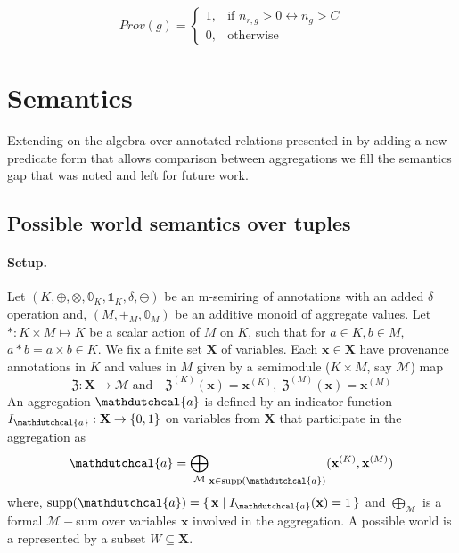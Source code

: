\documentclass[10pt,a4paper]{scrartcl}
\theoremstyle{definition}
\theoremstyle{remark}
\begin{document}
$$Prov(g) = \begin{cases}
   1, & \text{if } n_{r, g} > 0 \leftrightarrow n_g > C \\
   0, & \text{otherwise}
   \end{cases}$$

\section{Semantics}
Extending on the algebra over annotated 
relations presented in \cite{sen2025provsqlgeneralkeepingtrack} by 
adding a new predicate form that allows 
comparison between aggregations we fill the semantics gap that 
was noted and left for future work.
\subsection{Possible world semantics over tuples}
\paragraph{Setup.}
Let $(K,\oplus,\otimes,\mathbb{0}_K,\mathbb{1}_K,\delta,\ominus)$ be an m-semiring of annotations with an 
added $\delta$ operation and, $(M,+_M,\mathbb{0}_M)$ be an 
additive monoid of aggregate values. Let $*:K\times M \mapsto K$ be a scalar action of $M$ on $K$, such that for $a \in K, b \in M$, 
$a * b = a \times b \in K$.
We fix a finite set $\mathbf{X}$ of variables. Each $\mathbf{x}\in\mathbf{X}$ have provenance annotations in $K$ and values in $M$ 
given by a semimodule ($K\times M$, say $\mathcal{M}$) map 
\[
\mathfrak{Z}:\mathbf{X}\rightarrow \mathcal{M}\; \text{and} \quad \mathfrak{Z}^{(K)}(\mathbf{x})=\mathbf{x}^{(K)}, \; \mathfrak{Z}^{(M)}(\mathbf{x})=\mathbf{x}^{(M)}
\]
An aggregation $\mathdutchcal{a}$ is defined by an indicator function 
$I_\mathdutchcal{a}:\mathbf{X}\rightarrow \{0,1\}$
on variables from $\mathbf{X}$ that participate in the aggregation as 
\[
\mathdutchcal{a} = {\bigoplus_\mathcal{M}}_{\mathbf{x}\in \mathrm{supp}(\mathdutchcal{a})}(\mathbf{x}^{(K)},\mathbf{x}^{(M)})
\]
where, 
$\mathrm{supp}(\mathdutchcal{a})=\{\,\mathbf{x} \mid I_\mathdutchcal{a}(\mathbf{x})=1 \,\}$ and 
$\bigoplus_{\mathcal{M}}$ is a formal $\mathcal{M}-$sum over 
variables $\mathbf{x}$ involved in the aggregation.
A possible world is a represented by a subset $W\subseteq\mathbf{X}$.
\end{document}
